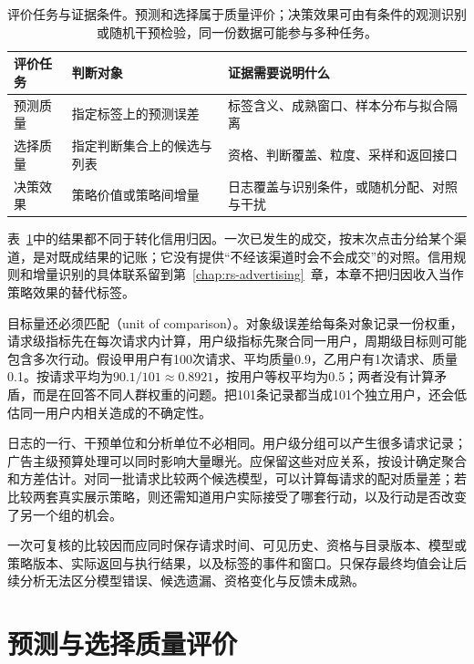 \begin{table}[htbp]
  \centering
  \small
  \begin{tabularx}{\linewidth}{@{}p{22mm}XX@{}}
    \toprule
    评价任务 & 判断对象 & 证据需要说明什么\\
    \midrule
    预测质量 & 指定标签上的预测误差 & 标签含义、成熟窗口、样本分布与拟合隔离\\
    选择质量 & 指定判断集合上的候选与列表 & 资格、判断覆盖、粒度、采样和返回接口\\
    决策效果 & 策略价值或策略间增量 & 日志覆盖与识别条件，或随机分配、对照与干扰\\
    \bottomrule
  \end{tabularx}
  \caption{评价任务与证据条件。预测和选择属于质量评价；决策效果可由有条件的观测识别或随机干预检验，同一份数据可能参与多种任务。}
  \label{tab:rs-evaluation-targets}
\end{table}

表~\ref{tab:rs-evaluation-targets}中的结果都不同于转化信用归因。一次已发生的成交，按末次点击分给某个渠道，是对既成结果的记账；它没有提供“不经该渠道时会不会成交”的对照。信用规则和增量识别的具体联系留到第~\ref{chap:rs-advertising}~章，本章不把归因收入当作策略效果的替代标签。

目标量还必须匹配（unit of comparison）。对象级误差给每条对象记录一份权重，请求级指标先在每次请求内计算，用户级指标先聚合同一用户，周期级目标则可能包含多次行动。假设甲用户有100次请求、平均质量0.9，乙用户有1次请求、质量0.1。按请求平均为$90.1/101\approx0.8921$，按用户等权平均为0.5；两者没有计算矛盾，而是在回答不同人群权重的问题。把101条记录都当成101个独立用户，还会低估同一用户内相关造成的不确定性。

日志的一行、干预单位和分析单位不必相同。用户级分组可以产生很多请求记录；广告主级预算处理可以同时影响大量曝光。应保留这些对应关系，按设计确定聚合和方差估计。对同一批请求比较两个候选模型，可以计算每请求的配对质量差；若比较两套真实展示策略，则还需知道用户实际接受了哪套行动，以及行动是否改变了另一个组的机会。

一次可复核的比较因而应同时保存请求时间、可见历史、资格与目录版本、模型或策略版本、实际返回与执行结果，以及标签的事件和窗口。只保存最终均值会让后续分析无法区分模型错误、候选遗漏、资格变化与反馈未成熟。

\section{预测与选择质量评价}
\label{sec:rs-evaluation-quality}

